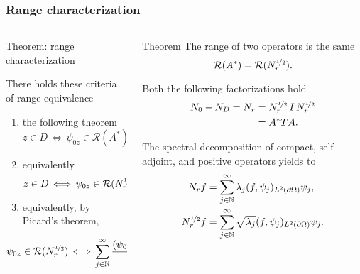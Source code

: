 \documentclass[10pt,xcolor={dvipsnames}]{beamer}
\theoremstyle{plain}
\theoremstyle{plain}
\begin{document}
\begin{frame}
 \frametitle{Range characterization}
\begin{columns}[T]
\begin{column}{0.5\textwidth}
\begin{block}{Theorem: range characterization}
 {\footnotesize
 There holds these criteria of range equivalence
 \begin{enumerate}
  \item the following theorem
  {\normalsize
 \begin{equation}
   z \in D \,\Longleftrightarrow \,\psi_{0z} \in \mathcal{R}(A^*),
 \end{equation}}
 \item equivalently
  {\normalsize
 \begin{equation}
  z \in D \,\Longleftrightarrow \,\psi_{0z} \in \mathcal{R}(N_r^{\nicefrac{1}{2}}),
 \end{equation}}
 \item equivalently, by Picard's theorem,
\end{enumerate}
\small{
\begin{equation}
   \psi_{0z} \in \mathcal{R}(N_r^{\nicefrac{1}{2}})
   \,\Longleftrightarrow \,
   \sum_{j\in \mathbb{N}}^\infty \frac{(\psi_{0z},\psi_j)^2}{\lambda_j}<\infty. 
\end{equation}
}
}
\end{block}
\end{column}
\begin{column}{0.47\textwidth}
 \begin{block}
 {\small Theorem}
 {\footnotesize
 The range of two operators is the same}
 \begin{equation}
  \mathcal{R}(A^*) = \mathcal{R}(N_r^{\nicefrac{1}{2}}).
 \end{equation}
 \end{block}{\footnotesize
Both the following factorizations hold}
\vspace{-0.2cm}
\begin{align}
\label{eq:factorization-two}
 {N_0} - {N_D}=N_r&=N_r^{\nicefrac{1}{2}}\,I\,N_r^{\nicefrac{1}{2}}\\
 &= A^*TA.
\end{align}
 
\vspace{-0.4cm}
{\footnotesize
The spectral decomposition of compact, self-adjoint, and positive operators yields to}
{\small
\begin{align}
N_r f &= \sum_{j\in \mathbb{N}}^\infty \lambda_j(f,\psi_j)_{L^2(\partial\Omega)} \psi_j ,\\
N_r^{\nicefrac{1}{2}} f &= \sum_{j\in \mathbb{N}}^\infty \sqrt{\lambda_j}(f,\psi_j)_{L^2(\partial\Omega)} \psi_j.
\end{align}}

\end{column}
\end{columns}
\end{frame}
\end{document}
